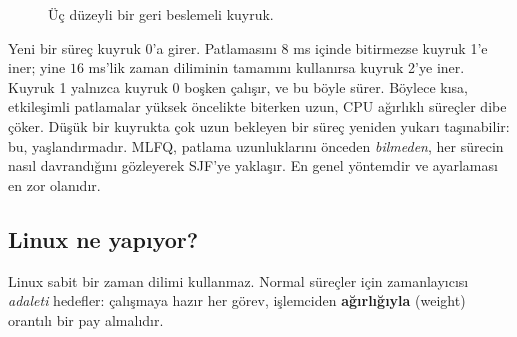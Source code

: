 \documentclass[11pt,a4paper]{article}
\newcommand{\term}[1]{\textbf{\color{mintdeep}#1}}
\begin{document}
\begin{figure}[H]
\centering
{}
\caption{Üç düzeyli bir geri beslemeli kuyruk.}
\end{figure}

Yeni bir süreç kuyruk 0'a girer. Patlamasını $8$ ms içinde bitirmezse kuyruk 1'e iner; yine $16$ ms'lik zaman diliminin tamamını kullanırsa kuyruk 2'ye iner. Kuyruk 1 yalnızca kuyruk 0 boşken çalışır, ve bu böyle sürer. Böylece kısa, etkileşimli patlamalar yüksek öncelikte biterken uzun, CPU ağırlıklı süreçler dibe çöker. Düşük bir kuyrukta çok uzun bekleyen bir süreç yeniden yukarı taşınabilir: bu, yaşlandırmadır. MLFQ, patlama uzunluklarını önceden \emph{bilmeden}, her sürecin nasıl davrandığını gözleyerek SJF'ye yaklaşır. En genel yöntemdir ve ayarlaması en zor olanıdır.

\subsection{Linux ne yapıyor?}

Linux sabit bir zaman dilimi kullanmaz. Normal süreçler için zamanlayıcısı \emph{adaleti} hedefler: çalışmaya hazır her görev, işlemciden \term{ağırlığıyla} (weight) orantılı bir pay almalıdır.
\end{document}
